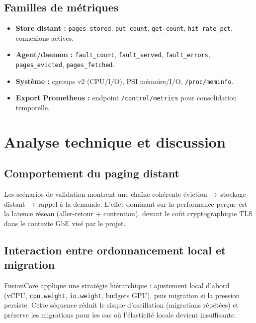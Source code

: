\subsection{Familles de métriques}

\begin{itemize}
    \item \textbf{Store distant :} \texttt{pages\_stored}, \texttt{put\_count}, \texttt{get\_count}, \texttt{hit\_rate\_pct}, connexions actives.
    \item \textbf{Agent/daemon :} \texttt{fault\_count}, \texttt{fault\_served}, \texttt{fault\_errors}, \texttt{pages\_evicted}, \texttt{pages\_fetched}.
    \item \textbf{Système :} cgroups v2 (CPU/I/O), PSI mémoire/I/O, \texttt{/proc/meminfo}.
    \item \textbf{Export Prometheus :} endpoint \texttt{/control/metrics} pour consolidation temporelle.
\end{itemize}

\section{Analyse technique et discussion}
\label{sec:resultats}

\subsection{Comportement du paging distant}

Les scénarios de validation montrent une chaîne cohérente éviction\,$\rightarrow$\,stockage distant\,$\rightarrow$\,rappel à la demande. L’effet dominant sur la performance perçue est la latence réseau (aller-retour + contention), devant le coût cryptographique TLS dans le contexte GbE visé par le projet.

\subsection{Interaction entre ordonnancement local et migration}

FusionCore applique une stratégie hiérarchique : ajustement local d’abord (vCPU, \texttt{cpu.weight}, \texttt{io.weight}, budgets GPU), puis migration si la pression persiste. Cette séquence réduit le risque d’oscillation (migrations répétées) et préserve les migrations pour les cas où l’élasticité locale devient insuffisante.

